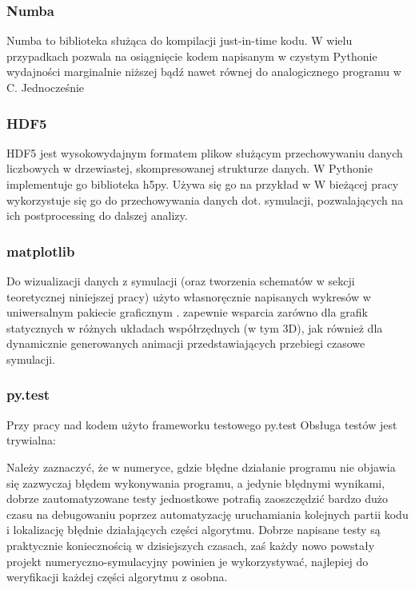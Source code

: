     \subsubsection{Numba}
    Numba to biblioteka służąca do kompilacji just-in-time kodu. %
    W wielu przypadkach %
    pozwala na osiągnięcie kodem napisanym w czystym Pythonie wydajności marginalnie niższej bądź nawet równej do analogicznego
    programu w C. %
    Jednocześnie

    \subsubsection{HDF5}
    HDF5 jest wysokowydajnym formatem plikow służącym przechowywaniu danych liczbowych w drzewiastej,
    skompresowanej strukturze danych.
    W Pythonie implementuje go biblioteka h5py.
    Używa się go na przykład w %
    W bieżącej pracy wykorzystuje się go do przechowywania danych dot. symulacji,
    pozwalających na ich postprocessing do dalszej analizy.

    \subsubsection{matplotlib}
    Do wizualizacji danych z symulacji
    (oraz tworzenia schematów w sekcji teoretycznej niniejszej pracy)
    użyto własnoręcznie napisanych wykresów w uniwersalnym
    pakiecie graficznym .  zapewnie wsparcia zarówno
    dla grafik statycznych w różnych układach współrzędnych (w tym 3D), jak również dla
    dynamicznie generowanych animacji przedstawiających przebiegi czasowe symulacji.

    \subsubsection{py.test}
    Przy pracy nad kodem użyto frameworku testowego py.test %
    Obsługa testów jest trywialna:


    Należy zaznaczyć, że w numeryce, gdzie błędne działanie programu nie objawia się
    zazwyczaj błędem wykonywania programu, a jedynie błędnymi wynikami, dobrze zautomatyzowane
    testy jednostkowe potrafią zaoszczędzić bardzo dużo czasu na debugowaniu
    poprzez automatyzację uruchamiania kolejnych partii kodu i lokalizację błędnie działających
    części algorytmu. Dobrze napisane testy są praktycznie koniecznością w dzisiejszych
    czasach, zaś każdy nowo powstały projekt numeryczno-symulacyjny powinien je
    wykorzystywać, najlepiej do weryfikacji każdej części algorytmu z osobna.

